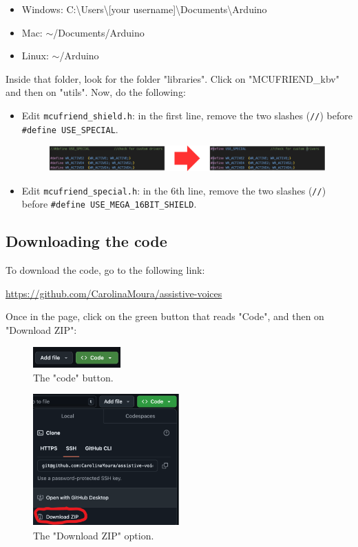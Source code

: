 \documentclass{article}
\begin{document}
\begin{itemize}
    \item Windows: C:\textbackslash Users\textbackslash [your username]\textbackslash Documents\textbackslash Arduino
    \item Mac: \(\sim \)/Documents/Arduino
    \item Linux: \(\sim \)/Arduino
\end{itemize}

Inside that folder, look for the folder "libraries". Click on "MCUFRIEND\_kbv" and then on "utils". Now, do the following:

\begin{itemize}
    \item Edit \texttt{mcufriend\_shield.h}: in the first line, remove the two slashes (\texttt{//}) before \texttt{\#define USE\_SPECIAL}.
    \begin{figure}[h]
        \centering
        \includegraphics[width=1.3\textwidth]{../images/mcufriend_shield.png}
        \end{figure}
    \item Edit \texttt{mcufriend\_special.h}: in the 6th line, remove the two slashes (\texttt{//}) before \texttt{\#define USE\_MEGA\_16BIT\_SHIELD}.
\end{itemize}

\subsection{Downloading the code}
To download the code, go to the following link:

\href{https://github.com/CarolinaMoura/assistive-voices}{https://github.com/CarolinaMoura/assistive-voices}

Once in the page, click on the green button that reads "Code", and then on "Download ZIP":

\begin{figure}[h]
\centering
\includegraphics[width=0.3\textwidth]{../images/code.png}
\caption{The "code" button.}
\end{figure}

\begin{figure}[h]
\centering
\includegraphics[width=0.5\textwidth]{../images/download_zip.png}
\caption{The "Download ZIP" option.}
\end{figure}
\end{document}
